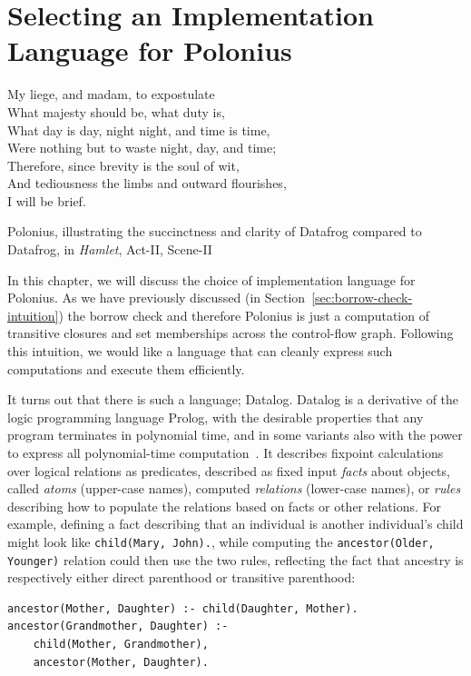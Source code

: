 \documentclass[11pt,a4paper,twoside,openany]{report}
\newcommand{\InDatalog}[1]{\texttt{#1}}
\renewcommand\_{\textunderscore\allowbreak}
\begin{document}
\chapter{Selecting an Implementation Language for Polonius}\label{cha:datalog}

\epigraph{My liege, and madam, to expostulate\\
  What majesty should be, what duty is,\\
  What day is day, night night, and time is time,\\
  Were nothing but to waste night, day, and time;\\
  Therefore, since brevity is the soul of wit,\\
  And tediousness the limbs and outward flourishes,\\
  I will be brief.}{Polonius, illustrating the succinctness and clarity of
  Datafrog compared to Datafrog, in \textit{Hamlet}, Act-II, Scene-II}

In this chapter, we will discuss the choice of implementation language for
Polonius. As we have previously discussed (in
Section~\ref{sec:borrow-check-intuition}) the borrow check and therefore
Polonius is just a computation of transitive closures and set memberships across
the control-flow graph. Following this intuition, we would like a language that
can cleanly express such computations and execute them efficiently.

It turns out that there is such a language; Datalog. Datalog is a derivative of
the logic programming language Prolog, with the desirable properties that any
program terminates in polynomial time, and in some variants also with the power
to express all polynomial-time computation~\cite{afrati_datalog_1995}. It
describes fixpoint calculations over logical relations as predicates, described
as fixed input \emph{facts} about objects, called \emph{atoms} (upper-case
names), computed \emph{relations} (lower-case names), or \emph{rules} describing
how to populate the relations based on facts or other relations. For example,
defining a fact describing that an individual is another individual's child
might look like \InDatalog{child(Mary, John).}, while computing the
\InDatalog{ancestor(Older, Younger)} relation could then use the two rules,
reflecting the fact that ancestry is respectively either direct parenthood or
transitive parenthood:
\begin{verbatim}
ancestor(Mother, Daughter) :- child(Daughter, Mother).
ancestor(Grandmother, Daughter) :- 
    child(Mother, Grandmother),
    ancestor(Mother, Daughter).
\end{verbatim}
\end{document}
